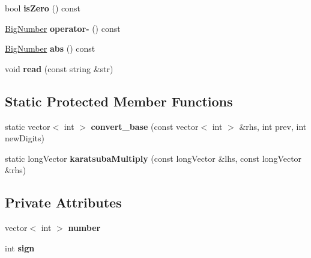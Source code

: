 \begin{DoxyCompactItemize}
bool {\bfseries is\+Zero} () const
\item 
\mbox{\label{class_big_number_af58aad57ff0b369a42e0204c35b17518}} 
\mbox{\hyperlink{class_big_number}{Big\+Number}} {\bfseries operator-\/} () const
\item 
\mbox{\label{class_big_number_a7ce620792e79930d85c6d5f48771e22d}} 
\mbox{\hyperlink{class_big_number}{Big\+Number}} {\bfseries abs} () const
\item 
\mbox{\label{class_big_number_a0f83c1fcde23a798c84f1636502e8ebd}} 
void {\bfseries read} (const string \&str)
\end{DoxyCompactItemize}
\subsection*{Static Protected Member Functions}
\begin{DoxyCompactItemize}
\item 
\mbox{\label{class_big_number_aeb2eaf57e703905afe1af40de3d7bc3c}} 
static vector$<$ int $>$ {\bfseries convert\+\_\+base} (const vector$<$ int $>$ \&rhs, int prev, int new\+Digits)
\item 
\mbox{\label{class_big_number_a8166b11d822fe5fbc299476b32299ad8}} 
static long\+Vector {\bfseries karatsuba\+Multiply} (const long\+Vector \&lhs, const long\+Vector \&rhs)
\end{DoxyCompactItemize}
\subsection*{Private Attributes}
\begin{DoxyCompactItemize}
\item 
\mbox{\label{class_big_number_aefe6af3de273c7e77d02f08f9f6067d0}} 
vector$<$ int $>$ {\bfseries number}
\item 
\mbox{\label{class_big_number_ad373a37e6b7de783d78b0998733902a5}} 
int {\bfseries sign}
\end{DoxyCompactItemize}
